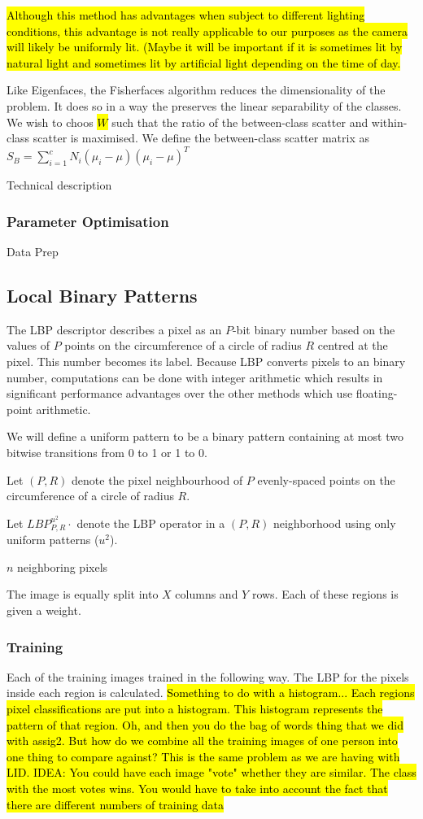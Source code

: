 \documentclass{article}
\begin{document}
\hl{Although this method has advantages when subject to different lighting conditions, this advantage is not really applicable to our purposes as the camera will likely be uniformly lit. (Maybe it will be important if it is sometimes lit by natural light and sometimes lit by artificial light depending on the time of day.}

Like Eigenfaces, the Fisherfaces algorithm reduces the dimensionality of the problem. It does so in a way the preserves the linear separability of the classes. We wish to choos \hl{$W$} such that the ratio of the between-class scatter and within-class scatter is maximised. We define the between-class scatter matrix as $S_B = \sum_{i=1}^{c}N_i(\mu_i - \mu)(\mu_i - \mu)^T$

Technical description
\subsubsection{Parameter Optimisation}
Data Prep

\subsection{Local Binary Patterns}
The LBP descriptor describes a pixel as an $P$-bit binary number based on the values of $P$ points on the circumference of a circle of radius $R$ centred at the pixel. This number becomes its label.
Because LBP converts pixels to an binary number, computations can be done with integer arithmetic which results in significant performance advantages over the other methods which use floating-point arithmetic.

We will define a uniform pattern to be a binary pattern containing at most two bitwise transitions from 0 to 1 or 1 to 0. \cite{ojala2002multiresolution}

Let $(P, R)$ denote the pixel neighbourhood of $P$ evenly-spaced points on the circumference of a circle of radius $R$.

Let $LBP^{u^2}_{P,R}\cdot$ denote the LBP operator in a $(P, R)$ neighborhood using only uniform patterns ($u^2$).

$n$ neighboring pixels 

The image is equally split into $X$ columns and $Y$ rows. Each of these regions is given a weight.
\subsubsection{Training}
Each of the training images trained in the following way. The LBP for the pixels inside each region is calculated.
\hl{Something to do with a histogram...
Each regions pixel classifications are put into a histogram. This histogram represents the pattern of that region.
Oh, and then you do the bag of words thing that we did with assig2. But how do we combine all the training images of one person into one thing to compare against? This is the same problem as we are having with LID. IDEA: You could have each image "vote" whether they are similar. The class with the most votes wins. You would have to take into account the fact that there are different numbers of training data}
\end{document}
